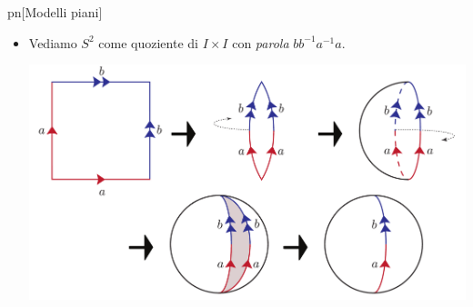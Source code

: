 \begin{example}{pn}[Modelli piani]
\begin{itemize}
\begin{center}
		\end{center}
		\item Vediamo $S^2$ come quoziente di $I\times I$ con \textit{parola} $bb^{-1}a^{-1}a$.
		\begin{center}
			\includegraphics[trim=0cm 0cm 0cm 0cm, clip, scale=0.375]{images/sphere.pdf}
		\end{center}
	\end{itemize}
\end{example}
